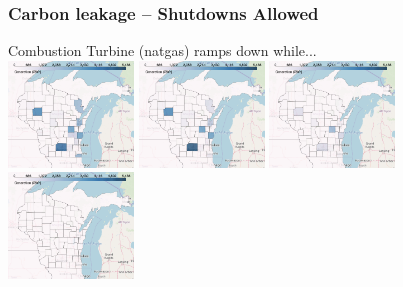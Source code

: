\documentclass[xcolor=dvipsnames]{beamer}
\begin{document}
\begin{frame}
  \frametitle{Carbon leakage -- Shutdowns Allowed}
  Combustion Turbine (natgas) ramps down while... \\
  \includegraphics[width=0.25\textwidth]{includes/no_leakage_shutdowns_CT_r0.png}
  \includegraphics[width=0.25\textwidth]{includes/no_leakage_shutdowns_CT_r2.png}
  \includegraphics[width=0.25\textwidth]{includes/no_leakage_shutdowns_CT_r3.png}
  \includegraphics[width=0.25\textwidth]{includes/no_leakage_shutdowns_CT_r4.png}


\end{frame}
\end{document}
